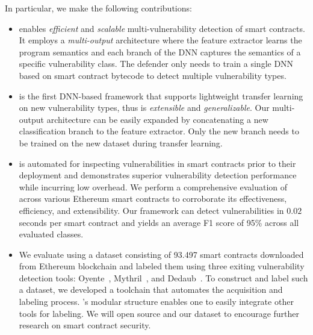 \vspace{0.2em} 
In particular, we make the following contributions:

\begin{itemize}
    \item \sys{} enables \textit{efficient} and \textit{scalable} multi-vulnerability detection of smart contracts. It employs a \textit{multi-output} architecture where the feature extractor
    learns the program semantics and each branch of the DNN captures the semantics of a specific vulnerability class. The defender only needs to train a single DNN based on smart contract bytecode to detect multiple vulnerability types.

    \item \sys{} is the first DNN-based
    framework that supports lightweight transfer learning on new vulnerability types, thus is \textit{extensible} and \textit{generalizable}. Our multi-output architecture can be easily expanded by concatenating a new classification branch to the feature extractor. Only the new branch needs to be trained on the new dataset during transfer learning. 
    
    \vspace{0.1em}
    \item \sys{} is automated for inspecting vulnerabilities in smart contracts prior to their deployment and demonstrates superior vulnerability detection performance while incurring low overhead. We perform a comprehensive evaluation of \sys{} across various Ethereum smart contracts to corroborate its effectiveness, efficiency, and extensibility. Our framework can detect vulnerabilities in $0.02$ seconds per smart contract and yields an average F1 score of 95\% across all evaluated classes.  

    \vspace{0.1em}
    \item We evaluate \sys{} using a dataset consisting of 93.497 smart contracts downloaded from Ethereum blockchain and labeled them using three exiting vulnerability detection tools: Oyente~\cite{rw_oyente_repo}, Mythril~\cite{rw_mythril_repo}, and Dedaub~\cite{dedaub}. To construct and label such a dataset, we developed a toolchain \datatool{} that automates the acquisition and labeling process. \datatool{}'s modular structure enables one to easily integrate other tools for labeling. We will open source \datatool{} and our dataset to encourage further research on smart contract security.   
\end{itemize}

